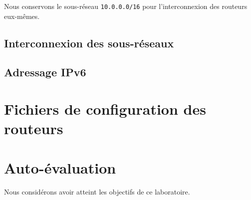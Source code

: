 \documentclass[11pt,a4paper]{article}
\begin{document}
Nous conservons le sous-réseau \texttt{10.0.0.0/16} pour l'interconnexion des routeurs eux-mêmes.

\subsection{Interconnexion des sous-réseaux}

\subsection{Adressage IPv6}

\section{Fichiers de configuration des routeurs}

\section{Auto-évaluation}

Nous considérons avoir atteint les objectifs de ce laboratoire.
\end{document}
